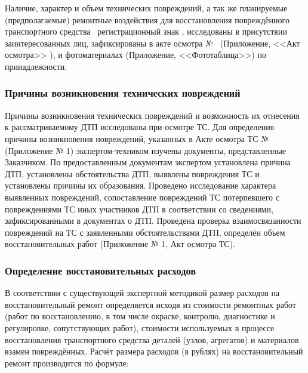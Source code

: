      
   Наличие, характер и объем технических повреждений, а так же  планируемые (предполагаемые) ремонтные воздействия для восстановления повреждённого  
   транспортного средства \tc\, регистрационный знак \grz, исследованы в присутствии заинтересованных лиц, зафиксированы в акте осмотра № \NomerDoc\,  (Приложение, <<Акт осмотра>> ),  и фотоматериалах (Приложение, <<Фототаблица>>) по принадлежности. 
          
          
\subsubsection{Причины возникновения технических повреждений}
          
     Причины возникновения технических повреждений и возможность их отнесения к
рассматриваемому ДТП исследованы при осмотре ТС. Для определения причины возникновения повреждений, указанных в Акте осмотра ТС  №  \NomerDoc\, (Приложение № 1) экспертом-техником изучены документы, представленные Заказчиком. По предоставленным документам экспертом установлена причина ДТП, установлены обстоятельства ДТП, выявлены повреждения ТС и установлены причины их образования. Проведено исследование характера выявленных повреждений, сопоставление повреждений ТС потерпевшего с повреждениями ТС иных участников ДТП в соответствии со сведениями, зафиксированными в документах о ДТП.  Проведена проверка взаимосвязанности повреждений на ТС с заявленными обстоятельствами ДТП, определён объем восстановительных работ (Приложение № 1, Акт осмотра ТС). 


\subsubsection{Определение восстановительных расходов}

 В соответствии с существующей экспертной методикой размер расходов на восстановительный ремонт определяется исходя из стоимости ремонтных работ (работ по восстановлению, в том числе окраске, контролю, диагностике и регулировке, сопутствующих работ), стоимости используемых в процессе восстановления транспортного средства деталей (узлов, агрегатов) и материалов взамен повреждённых. Расчёт размера расходов (в рублях) на восстановительный ремонт производится по формуле: 
      
